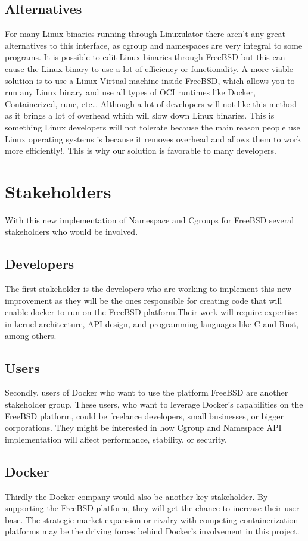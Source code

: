 \documentclass[12pt, dvipsnames, a4paper]{article}
\begin{document}
\subsection{Alternatives}
For many Linux binaries running through Linuxulator there aren't any great alternatives to this interface, as cgroup and namespaces are very integral to some programs. It is possible to edit Linux binaries through FreeBSD but this can cause the Linux binary to use a lot of efficiency or functionality. A more viable solution is to use a Linux Virtual machine inside FreeBSD, which allows you to run any Linux binary and use all types of OCI runtimes like Docker, Containerized, runc, etc… Although a lot of developers will not like this method as it brings a lot of overhead which will slow down Linux binaries. This is something Linux developers will not tolerate because the main reason people use Linux operating systems is because it removes overhead and allows them to work more efficiently!. This is why our solution is favorable to many developers.

\section{Stakeholders}
With this new implementation of Namespace and Cgroups for FreeBSD several stakeholders who would be involved. 

\subsection{Developers}
The first stakeholder is the developers who are working to implement this new improvement as they will be the ones responsible for creating code that will enable docker to run on the FreeBSD platform.Their work will require expertise in kernel architecture, API design, and programming languages like C and Rust, among others.

\subsection{Users}
Secondly, users of Docker who want to use the platform FreeBSD are another stakeholder group. These users, who want to leverage Docker's capabilities on the FreeBSD platform, could be freelance developers, small businesses, or bigger corporations. They might be interested in how Cgroup and Namespace API implementation will affect performance, stability, or security.

\subsection{Docker}
Thirdly the Docker company would also be another key stakeholder. By supporting the FreeBSD platform, they will get the chance to increase their user base. The strategic market expansion or rivalry with competing containerization platforms may be the driving forces behind Docker's involvement in this project.
\end{document}
